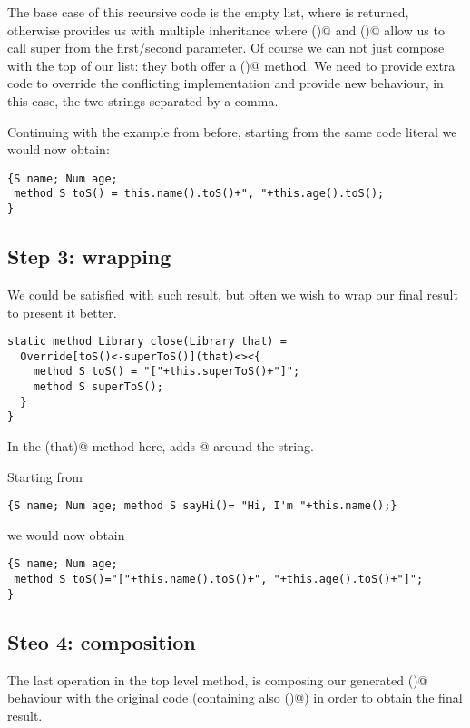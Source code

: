 The base case of this recursive code is the empty list, where \Q@acc@ is returned,
otherwise \Q@Override@ provides us with multiple inheritance where
()@ and ()@
allow us to call super from the first/second parameter.
Of course we can not just compose \Q@acc@ with the top of our list: they both offer
a \Q@toS()@ method. We need to provide extra code to override the conflicting implementation
and provide new behaviour, in this case, the two strings separated by a comma.

\noindent
Continuing with the example from before, starting from the same code literal we would now obtain:

\begin{lstlisting}
{S name; Num age;
 method S toS() = this.name().toS()+", "+this.age().toS();
}
\end{lstlisting}

\subsection*{Step 3: wrapping}
We could be satisfied with such result, but often we wish to wrap our final result
to present it better.

\begin{lstlisting}
static method Library close(Library that) =
  Override[toS()<-superToS()](that)<><{
    method S toS() = "["+this.superToS()+"]";
    method S superToS();
  }
}
\end{lstlisting}

\noindent
  In the \Q@close(that)@ method here, \Q@Override@ adds \Q@[]@ around the string.

\noindent
Starting from

\begin{lstlisting}
{S name; Num age; method S sayHi()= "Hi, I'm "+this.name();}
\end{lstlisting}

\noindent
we would now obtain

\begin{lstlisting}
{S name; Num age;
 method S toS()="["+this.name().toS()+", "+this.age().toS()+"]";
}
\end{lstlisting}

\subsection*{Steo 4: composition}
The last operation in the top level method, is composing our generated \Q@toS()@ behaviour with the
original code (containing also \Q@sayHi()@) in order to obtain the final result.

